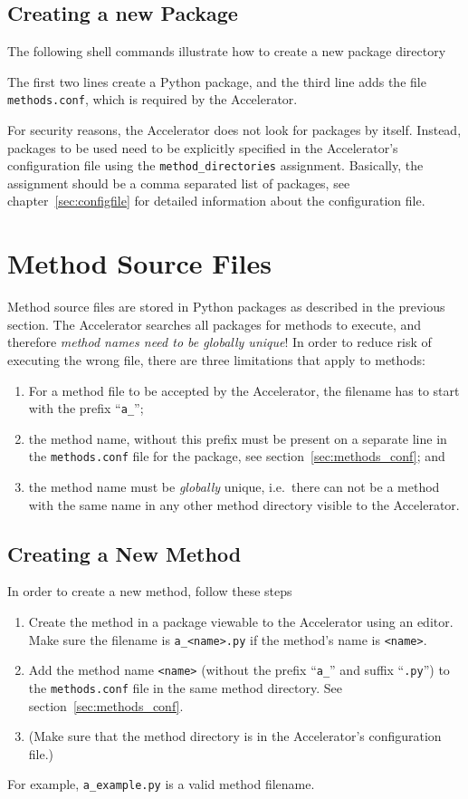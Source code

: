 \subsection{Creating a new Package}
The following shell commands illustrate how to create a new package
directory
\begin{shell}
\end{shell}
The first two lines create a Python package, and the third line adds
the file \texttt{methods.conf}, which is required by the Accelerator.

For security reasons, the Accelerator does not look for packages by
itself.  Instead, packages to be used need to be explicitly specified
in the Accelerator's configuration file using the
\texttt{method_directories} assignment.  Basically, the
assignment should be a comma separated list of packages, see
chapter~\ref{sec:configfile} for detailed information about the
configuration file.


\section{Method Source Files}
Method source files are stored in Python packages as described in the
previous section.  The Accelerator searches all packages for methods
to execute, and therefore \textsl{method names need to be globally
unique}!  In order to reduce risk of executing the wrong file, there
are three limitations that apply to methods:
\begin{enumerate}
\item For a method file to be accepted by the Accelerator, the
  filename has to start with the prefix ``\texttt{a\_}'';
\item the method name, without this prefix must be present on a
  separate line in the \texttt{methods.conf} file for the package, see
  section~\ref{sec:methods_conf}; and
\item the method name must be \emph{globally} unique, i.e.\ there can
  not be a method with the same name in any other method directory
  visible to the Accelerator.
\end{enumerate}


\subsection{Creating a New Method}
In order to create a new method, follow these steps
\begin{enumerate}
\item Create the method in a package viewable to the Accelerator
  using an editor.  Make sure the filename is \texttt{a\_<name>.py} if
  the method's name is \texttt{<name>}.
\item Add the method name \texttt{<name>} (without the prefix ``\texttt{a\_}'' and
  suffix ``\texttt{.py}'') to the \texttt{methods.conf} file in the
  same method directory.  See section~\ref{sec:methods_conf}.
\item (Make sure that the method directory is in the Accelerator's
  configuration file.)
\end{enumerate}
For example, \texttt{a\_example.py} is a valid method filename.


